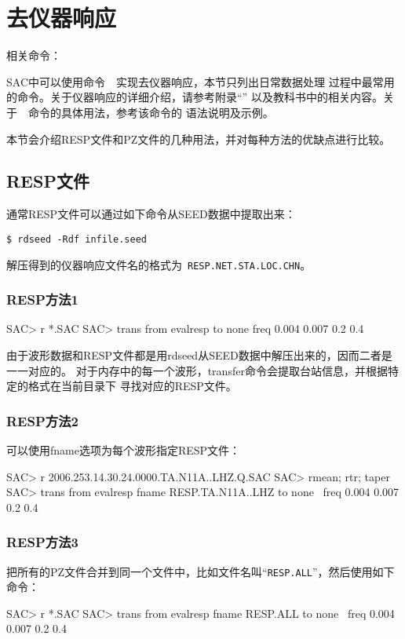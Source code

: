 \section{去仪器响应}
\label{sec:instrument-response}
相关命令：

SAC中可以使用命令~~实现去仪器响应，本节只列出日常数据处理
过程中最常用的命令。关于仪器响应的详细介绍，请参考附录``''
以及教科书中的相关内容。关于~~命令的具体用法，参考该命令的
语法说明及示例。

本节会介绍RESP文件和PZ文件的几种用法，并对每种方法的优缺点进行比较。
\subsection{RESP文件}
通常RESP文件可以通过如下命令从SEED数据中提取出来：
\begin{verbatim}
$ rdseed -Rdf infile.seed
\end{verbatim}
解压得到的仪器响应文件名的格式为~\verb+RESP.NET.STA.LOC.CHN+。

\subsubsection{RESP方法1}
\begin{SACCode}
SAC> r *.SAC
SAC> trans from evalresp to none freq 0.004 0.007 0.2 0.4
\end{SACCode}
由于波形数据和RESP文件都是用rdseed从SEED数据中解压出来的，因而二者是一一对应的。
对于内存中的每一个波形，transfer命令会提取台站信息，并根据特定的格式在当前目录下
寻找对应的RESP文件。

\subsubsection{RESP方法2}
可以使用fname选项为每个波形指定RESP文件：
\begin{SACCode}
SAC> r 2006.253.14.30.24.0000.TA.N11A..LHZ.Q.SAC
SAC> rmean; rtr; taper
SAC> trans from evalresp fname RESP.TA.N11A..LHZ to none \
                                freq 0.004 0.007 0.2 0.4
\end{SACCode}

\subsubsection{RESP方法3}
把所有的PZ文件合并到同一个文件中，比如文件名叫``\verb+RESP.ALL+''，然后使用如下命令：
\begin{SACCode}
SAC> r *.SAC
SAC> trans from evalresp fname RESP.ALL to none \
                            freq 0.004 0.007 0.2 0.4
\end{SACCode}

